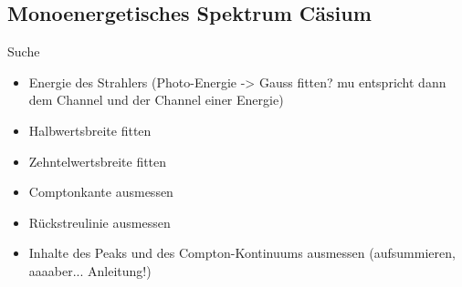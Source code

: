 \subsection{Monoenergetisches Spektrum Cäsium}
Suche
\begin{itemize}
	\item Energie des Strahlers (Photo-Energie -> Gauss fitten? mu entspricht dann dem Channel und der Channel einer Energie)
	\item Halbwertsbreite fitten
	\item Zehntelwertsbreite fitten
	\item Comptonkante ausmessen
	\item Rückstreulinie ausmessen
	\item Inhalte des Peaks und des Compton-Kontinuums ausmessen (aufsummieren, aaaaber... Anleitung!)
\end{itemize}
